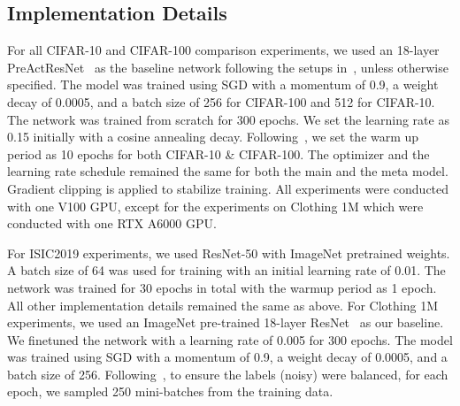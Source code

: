 \documentclass{article}
\begin{document}
   

\subsection{Implementation Details}
For all CIFAR-10 and CIFAR-100 comparison experiments, we used an 18-layer PreActResNet~\cite{he2016identity} as the baseline network following the setups in~\cite{li2020dividemix}, unless otherwise specified.
The model was trained using SGD with a momentum of
0.9, a weight decay of 0.0005, and a batch size of 256 for CIFAR-100 and 512 for CIFAR-10. 
The network was trained from scratch for 300 epochs. We
set the learning rate as 0.15 initially with a cosine annealing decay. Following~\cite{li2020dividemix}, we set the warm up
period as 10 epochs for both CIFAR-10 \& CIFAR-100. 
The optimizer and the learning rate schedule remained the same for both the main and the meta model. 
Gradient clipping is applied to stabilize training.
All experiments were conducted with one V100 GPU, except for the experiments on Clothing 1M which were conducted with one RTX A6000 GPU.

For ISIC2019 experiments, we used ResNet-50 with ImageNet pretrained weights. A batch size of 64 was used for training with an initial learning rate of 0.01. The network was trained for 30 epochs in total with the warmup period as 1 epoch.
All other implementation details remained the same as above.
For Clothing 1M experiments, we used an ImageNet pre-trained 18-layer ResNet~\cite{he2016identity} as our baseline. We finetuned the network with a learning rate of 0.005 for 300 epochs. The model was trained using SGD with a momentum of 0.9, a weight decay of 0.0005, and a batch size of 256. Following~\cite{li2020dividemix}, to ensure the labels (noisy) were balanced, for each epoch, we sampled 250 mini-batches from the training data. 
\end{document}
